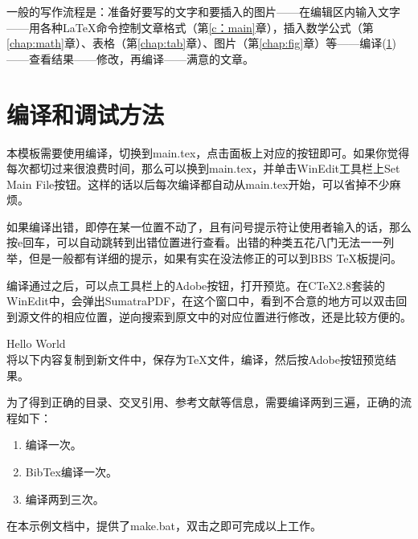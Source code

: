 一般的写作流程是：准备好要写的文字和要插入的图片------在编辑区内输入文字------用各种\LaTeX 命令控制文章格式（第\ref{c：main}章），插入数学公式（第\ref{chap:math}章）、表格（第\ref{chap:tab}章）、图片（第\ref{chap:fig}章）等------编译(\ref{s:compile})------查看结果------修改，再编译------满意的文章。


\section{编译和调试方法}
\label{s:compile}
本模板需要使用\XeLaTeX 编译，切换到main.tex，点击面板上对应的按钮即可。如果你觉得每次都切过来很浪费时间，那么可以换到main.tex，并单击WinEdit工具栏上Set Main File按钮。这样的话以后每次编译都自动从main.tex开始，可以省掉不少麻烦。

如果编译出错，即停在某一位置不动了，且有问号提示符让使用者输入的话，那么按e回车，可以自动跳转到出错位置进行查看。出错的种类五花八门无法一一列举，但是一般都有详细的提示，如果有实在没法修正的可以到BBS TeX板提问。

编译通过之后，可以点工具栏上的Adobe按钮，打开预览。在CTeX2.8套装的WinEdit中，会弹出SumatraPDF，在这个窗口中，看到不合意的地方可以双击回到源文件的相应位置，逆向搜索到原文中的对应位置进行修改，还是比较方便的。\par

\begin{example}{Hello World}\\
将以下内容复制到新文件中，保存为\TeX 文件，编译，然后按Adobe按钮预览结果。
\end{example}


为了得到正确的目录、交叉引用、参考文献等信息，需要编译两到三遍，正确的流程如下：
\begin{enumerate}
\item \XeLaTeX 编译一次。
\item BibTex编译一次。
\item \XeLaTeX 编译两到三次。
\end{enumerate}
在本示例文档中，提供了make.bat，双击之即可完成以上工作。



